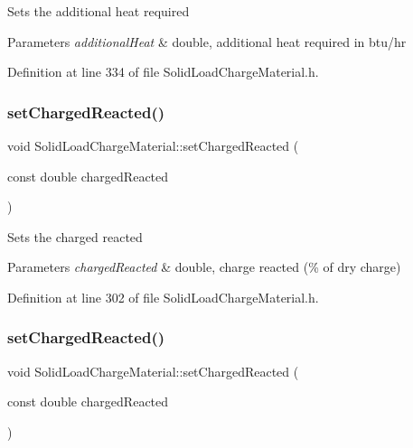 Sets the additional heat required 
\begin{DoxyParams}{Parameters}
{\em additional\+Heat} & double, additional heat required in btu/hr \\
\hline
\end{DoxyParams}


Definition at line 334 of file Solid\+Load\+Charge\+Material.\+h.

\mbox{\label{class_solid_load_charge_material_a38f3b832ff29f779a78a51fd7352fcd4}} 
\subsubsection{\texorpdfstring{set\+Charged\+Reacted()}{setChargedReacted()}\hspace{0.1cm}{\footnotesize\ttfamily [1/3]}}
{\footnotesize\ttfamily void Solid\+Load\+Charge\+Material\+::set\+Charged\+Reacted (\begin{DoxyParamCaption}\item[{const double}]{charged\+Reacted }\end{DoxyParamCaption})\hspace{0.3cm}{\ttfamily [inline]}}

Sets the charged reacted 
\begin{DoxyParams}{Parameters}
{\em charged\+Reacted} & double, charge reacted (\% of dry charge) \\
\hline
\end{DoxyParams}


Definition at line 302 of file Solid\+Load\+Charge\+Material.\+h.

\mbox{\label{class_solid_load_charge_material_a38f3b832ff29f779a78a51fd7352fcd4}} 
\subsubsection{\texorpdfstring{set\+Charged\+Reacted()}{setChargedReacted()}\hspace{0.1cm}{\footnotesize\ttfamily [2/3]}}
{\footnotesize\ttfamily void Solid\+Load\+Charge\+Material\+::set\+Charged\+Reacted (\begin{DoxyParamCaption}\item[{const double}]{charged\+Reacted }\end{DoxyParamCaption})\hspace{0.3cm}{\ttfamily [inline]}}

